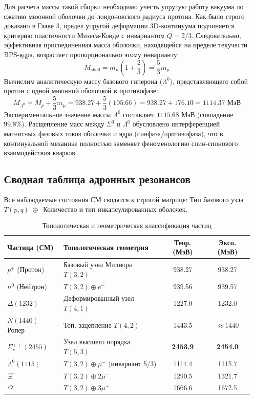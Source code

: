 \documentclass[12pt,a4paper]{article}
\begin{document}
	Для расчета массы такой сборки необходимо учесть упругую работу вакуума по сжатию мюонной оболочки до лондоновского радиуса протона. Как было строго доказано в Главе 3, предел упругой деформации 3D-континуума подчиняется критерию пластичности Мизеса-Коиде с инвариантом $Q = 2/3$.
	Следовательно, эффективная присоединенная масса оболочки, находящейся на пределе текучести BPS-ядра, возрастает пропорционально этому инварианту:
	\begin{equation}
		M_{\text{shell}} = m_\mu \left( 1 + \frac{2}{3} \right) = \frac{5}{3} m_\mu
	\end{equation}
	Вычислим аналитическую массу базового гиперона ($\Lambda^0$), представляющего собой протон с одной мюонной оболочкой в противофазе:
	\begin{equation}
		M_{\Lambda^0} = M_p + \frac{5}{3} m_\mu = 938.27 + \frac{5}{3}(105.66) = 938.27 + 176.10 = \mathbf{1114.37 \text{ МэВ}}
	\end{equation}
	Экспериментальное значение массы $\Lambda^0$ составляет $1115.68$ МэВ (совпадение $99.8\%$).
	Расщепление масс между $\Sigma^0$ и $\Lambda^0$ обусловлено интерференцией магнитных фазовых токов оболочки и ядра (синфаза/противофаза), что в континуальной механике полностью заменяет феноменологию спин-спинового взаимодействия кварков.
	
	\subsection{Сводная таблица адронных резонансов}
	
	Все наблюдаемые состояния СМ сводятся к строгой матрице: Тип базового узла $T(p,q) \ \oplus \ $ Количество и тип инкапсулированных оболочек.
	
	\begin{table}[htbp]
		\centering
		\caption{Топологическая и геометрическая классификация частиц}
		\renewcommand{\arraystretch}{1.3}
		\begin{tabular}{llcc}
			\toprule
			\textbf{Частица (СМ)} & \textbf{Топологическая геометрия} & \textbf{Теор. (МэВ)} & \textbf{Эксп. (МэВ)}\\
			\midrule
			$p^+$ (Протон) & Базовый узел Милнора $T(3,2)$ & 938.27 & 938.27 \\
			$n^0$ (Нейтрон) & $T(3,2) \oplus e^-$ & 939.56 & 939.57 \\
			$\Delta(1232)$ & Деформированный узел $T(4,1)$ & 1227.0 & 1232.0 \\
			$N(1440)$ Ропер & Топ. зацепление $T(4,2)$ & 1443.5 & $\approx 1440$ \\
			\midrule
			$\Sigma_c^{++}(2455)$ & Узел высшего порядка $T(5,3)$ & \textbf{2453.9} & \textbf{2454.0} \\
			\midrule
			$\Lambda^0(1115)$ & $T(3,2) \oplus \mu^-$ (инвариант 5/3) & 1114.4 & 1115.7 \\
			$\Xi^-$ & $T(3,2) \oplus 2\mu^-$ & 1290.5 & 1321.7 \\
			$\Omega^-$ & $T(3,2) \oplus 3\mu^-$ & 1666.6 & 1672.5 \\
			\bottomrule
		\end{tabular}
		\label{tab:zoo}
	\end{table}
	
\end{document}
